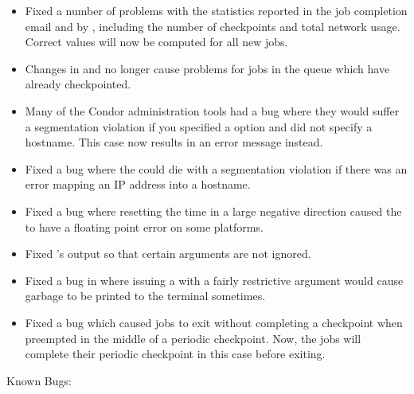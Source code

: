 \begin{itemize}
\item Fixed a number of problems with the statistics reported in the
job completion email and by  , including the
number of checkpoints and total network usage.  Correct values will
now be computed for all new jobs.

\item Changes in  and
 no longer cause problems for jobs in the
queue which have already checkpointed.

\item Many of the Condor administration tools had a bug where they
would suffer a segmentation violation if you specified a  
option and did not specify a hostname.
This case now results in an error message instead.

\item Fixed a bug where the  could die with a
segmentation violation if there was an error mapping an IP address
into a hostname.

\item Fixed a bug where resetting the time in a large negative direction
caused the  to have a floating point error on some
platforms.

\item Fixed 's output so that certain arguments are not ignored.

\item Fixed a bug in  where issuing a  with a
fairly restrictive  argument would cause garbage to be
printed to the terminal sometimes.

\item Fixed a bug which caused jobs to exit without completing a
checkpoint when preempted in the middle of a periodic checkpoint.
Now, the jobs will complete their periodic checkpoint in this case
before exiting.
\end{itemize}

\noindent Known Bugs:

